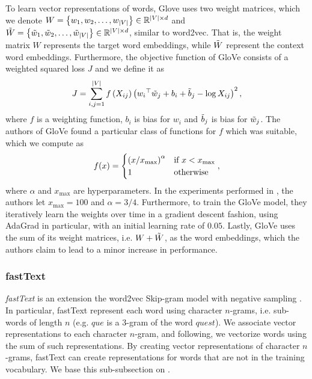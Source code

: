 To learn vector representations of words, Glove uses two weight matrices, which we denote $W=\left\{w_1, w_2, \ldots, w_{|V|}\right\} \in \mathbb{R}^{|V| \times d}$ and $\Tilde{W}=\left\{\Tilde{w}_1, \Tilde{w}_2, \ldots, \Tilde{w}_{|V|}\right\} \in \mathbb{R}^{|V| \times d}$, similar to word2vec. That is, the weight matrix $W$ represents the target word embeddings, while $\Tilde{W}$ represent the context word embeddings. Furthermore, the objective function of GloVe consists of a weighted squared loss $J$ and we define it as
\begin{align}
    J = \sum\limits_{i, j = 1}^{|V|} f \left(X_{ij}\right) \left({w_i}^\top \Tilde{w}_j + b_i + \Tilde{b}_j - \log X_{ij}\right)^2,
    \label{eqn:glove-loss}
\end{align}
where $f$ is a weighting function, $b_i$ is bias for $w_i$ and $\Tilde{b}_j$ is bias for $\Tilde{w}_j$. The authors of GloVe found a particular class of functions for $f$ which was suitable, which we compute as
\begin{align}
    f(x) = \begin{cases}
        \left(x / x_{\text{max}}\right)^\alpha & \mbox{if } x < x_{\text{max}} \\
        1 & \text{otherwise}
    \end{cases},
    \label{eqn:glove-loss-f-function}
\end{align}
where $\alpha$ and $x_{\text{max}}$ are hyperparameters. In the experiments performed in \cite{pennington2014glove}, the authors let $x_{\text{max}}=100$ and $\alpha=3/4$. Furthermore, to train the GloVe model, they iteratively learn the weights over time in a gradient descent fashion, using AdaGrad \cite{Duchi2011} in particular, with an initial learning rate of $0.05$. Lastly, GloVe uses the sum of its weight matrices, i.e. $W + \Tilde{W}$, as the word embeddings, which the authors claim to lead to a minor increase in performance.

\subsubsection{fastText}
\label{sec:fasttext}
\textit{fastText} is an extension the word2vec Skip-gram model with negative sampling \cite{bojanowski2017enriching}. In particular, fastText represent each word using character $n$-grams, i.e. sub-words of length $n$ (e.g. $\textit{que}$ is a $3$-gram of the word $\textit{quest}$). We associate vector representations to each character $n$-gram, and following, we vectorize words using the sum of such representations. By creating vector representations of character $n$-grams, fastText can create representations for words that are not in the training vocabulary. We base this sub-subsection on \cite{bojanowski2017enriching}.

